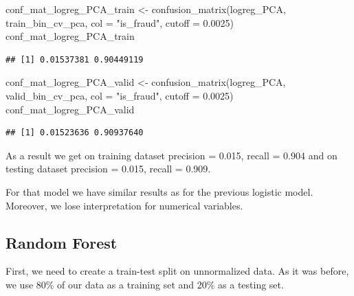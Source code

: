 \documentclass[
]{report}
\newenvironment{Shaded}{\begin{snugshade}}{\end{snugshade}}
\newcommand{\AttributeTok}[1]{\textcolor[rgb]{0.77,0.63,0.00}{#1}}
\newcommand{\FloatTok}[1]{\textcolor[rgb]{0.00,0.00,0.81}{#1}}
\newcommand{\FunctionTok}[1]{\textcolor[rgb]{0.00,0.00,0.00}{#1}}
\newcommand{\NormalTok}[1]{#1}
\newcommand{\OtherTok}[1]{\textcolor[rgb]{0.56,0.35,0.01}{#1}}
\newcommand{\SpecialCharTok}[1]{\textcolor[rgb]{0.00,0.00,0.00}{#1}}
\newcommand{\StringTok}[1]{\textcolor[rgb]{0.31,0.60,0.02}{#1}}
\begin{document}
\begin{Shaded}
\begin{Highlighting}[]
\NormalTok{conf\_mat\_logreg\_PCA\_train }\OtherTok{\textless{}{-}} 
  \FunctionTok{confusion\_matrix}\NormalTok{(logreg\_PCA, train\_bin\_cv\_pca, }\AttributeTok{col =} \StringTok{"is\_fraud"}\NormalTok{, }\AttributeTok{cutoff =} \FloatTok{0.0025}\NormalTok{)}
\NormalTok{conf\_mat\_logreg\_PCA\_train}
\end{Highlighting}
\end{Shaded}

\begin{verbatim}
## [1] 0.01537381 0.90449119
\end{verbatim}

\begin{Shaded}
\begin{Highlighting}[]
\NormalTok{conf\_mat\_logreg\_PCA\_valid }\OtherTok{\textless{}{-}} 
  \FunctionTok{confusion\_matrix}\NormalTok{(logreg\_PCA, valid\_bin\_cv\_pca, }\AttributeTok{col =} \StringTok{"is\_fraud"}\NormalTok{, }\AttributeTok{cutoff =} \FloatTok{0.0025}\NormalTok{)}
\NormalTok{conf\_mat\_logreg\_PCA\_valid}
\end{Highlighting}
\end{Shaded}

\begin{verbatim}
## [1] 0.01523636 0.90937640
\end{verbatim}

As a result we get on training dataset precision = 0.015, recall = 0.904
and on testing dataset precision = 0.015, recall = 0.909.

For that model we have similar results as for the previous logistic
model. Moreover, we lose interpretation for numerical variables.

\hypertarget{random-forest}{%
\subsection{Random Forest}\label{random-forest}}

First, we need to create a train-test split on unnormalized data. As it
was before, we use 80\% of our data as a training set and 20\% as a
testing set.

\begin{Shaded}
\end{Shaded}
\end{document}
